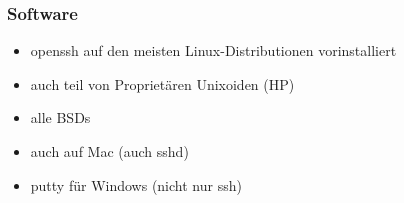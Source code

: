 \begin{frame}
\frametitle{Software}
\begin{itemize}
\item openssh auf den meisten Linux-Distributionen vorinstalliert
\item auch teil von Proprietären Unixoiden (HP)
\item alle BSDs
\item auch auf Mac (auch sshd)
\item putty für Windows (nicht nur ssh)
\end{itemize}
\end{frame}
